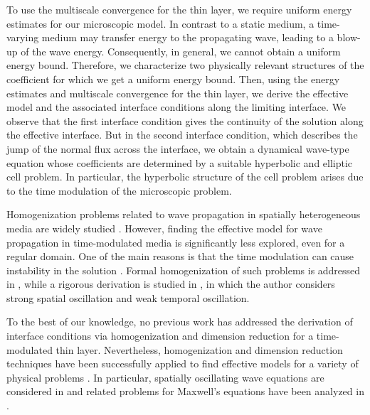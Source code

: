 \documentclass[11pt]{article}
\begin{document}
To use the multiscale convergence for the thin layer, we require uniform energy estimates for our microscopic model. In contrast to a static medium, a time-varying medium may transfer energy to the propagating wave, leading to a blow-up of the wave energy. Consequently, in general, we cannot obtain a uniform energy bound.  Therefore, we characterize two physically relevant structures of the coefficient for which we get a uniform energy bound. Then, using the energy estimates and  multiscale convergence for the thin layer, we derive the effective model and the associated interface conditions along the limiting interface. We observe that the first interface condition gives the continuity of the solution along the effective interface. But in the second interface condition, which describes the jump of the normal flux across the interface, we obtain a dynamical wave-type equation whose coefficients are determined by a suitable hyperbolic and elliptic cell problem.  In particular, the hyperbolic structure of the cell problem arises due to the time modulation of the microscopic problem.

Homogenization problems related to wave propagation in spatially heterogeneous media are widely studied \cite{Santosa1991Dispersive,BrahimOtsmane1992Correctors,doding2026optimizationbased,AllaireConca1998}. However, finding the effective model for wave propagation in time-modulated media is significantly less explored, even for a regular domain. One of the main reasons is that the time modulation can cause instability in the solution \cite{colombini1984hyperbolic}. Formal homogenization of such problems is addressed in \cite{DV26,TouboulLombardAssierGuenneauCraster2024}, while a rigorous derivation is studied in \cite{casado2011homogenization}, in which the author considers strong spatial oscillation and weak temporal oscillation.


To the best of our knowledge, no previous work has addressed the derivation of interface conditions via homogenization and dimension reduction for a time-modulated thin layer. Nevertheless, homogenization and dimension reduction techniques have been successfully applied to find effective models for a variety of physical problems \cite{BuffordDavoliFonseca2015,Freudenberg2026Analysis,FatimaIjiomaOgawaMuntean2014,Raveendran2022Scaling,MarusicPalokaPazanin2026}. In particular, spatially oscillating wave equations are considered in \cite{Gahn2026Effective,Gahn2026TwoScale} and related problems for Maxwell's equations have been analyzed in \cite{SchweizerWiedemann2026,AiyappanGrisoOrlikSufian2026}.
\end{document}
